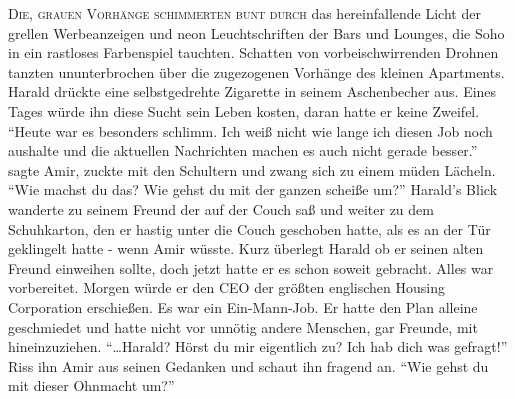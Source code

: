 

\lettrine{D}{ie, grauen Vorhänge schimmerten bunt durch} das hereinfallende Licht der grellen Werbeanzeigen und neon Leuchtschriften der Bars und Lounges, die Soho in ein rastloses Farbenspiel tauchten. Schatten von vorbeischwirrenden Drohnen tanzten ununterbrochen über die zugezogenen Vorhänge des kleinen Apartments. Harald drückte eine selbstgedrehte Zigarette in seinem Aschenbecher aus. Eines Tages würde ihn diese Sucht sein Leben kosten, daran hatte er keine Zweifel.
“Heute war es besonders schlimm. Ich weiß nicht wie lange ich diesen Job noch aushalte und die aktuellen Nachrichten machen es auch nicht gerade besser.” sagte Amir, zuckte mit den Schultern und zwang sich zu einem müden Lächeln. “Wie machst du das? Wie gehst du mit der ganzen scheiße um?”
Harald’s Blick wanderte zu seinem Freund der auf der Couch saß und weiter zu dem Schuhkarton, den er hastig unter die Couch geschoben hatte, als es an der Tür geklingelt hatte - wenn Amir wüsste. Kurz überlegt Harald ob er seinen alten Freund einweihen sollte, doch jetzt hatte er es schon soweit gebracht. Alles war vorbereitet. Morgen würde er den CEO der größten englischen Housing Corporation erschießen. Es war ein Ein-Mann-Job. Er hatte den Plan alleine geschmiedet und hatte nicht vor unnötig andere Menschen, gar Freunde, mit hineinzuziehen.
“…Harald? Hörst du mir eigentlich zu? Ich hab dich was gefragt!” Riss ihn Amir aus seinen Gedanken und schaut ihn fragend an. “Wie gehst du mit dieser Ohnmacht um?”

